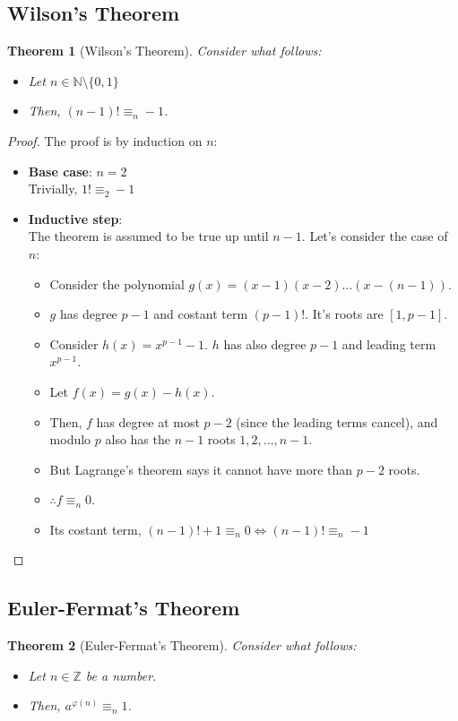 \documentclass[12pt, a4paper, english]{report}
\newtheorem{theorem}{Theorem}
\begin{document}
\subsection{Wilson's Theorem}\label{wilson_th}
\begin{theorem}[Wilson's Theorem]
    Consider what follows:
    \begin{itemize}
        \item Let $n \in \mathbb{N} \setminus \{0,1\}$
        \item Then, $(n-1)! \equiv_{n} -1$.
    \end{itemize}
\end{theorem}
\begin{proof}
    The proof is by induction on $n$:
    \begin{itemize}
        \item \textbf{Base case}: $n = 2$\\
        Trivially, $1! \equiv_{2} -1$
        \item \textbf{Inductive step}:\\
        The theorem is assumed to be true up until $n - 1$. Let's consider the case of $n$:\\
        \begin{itemize}
            \item Consider the polynomial $g(x) = (x-1)(x-2) \dots (x - (n-1))$.
            \item $g$ has degree $p-1$ and costant term $(p-1)!$. It's roots are $[1,p-1]$.
            \item Consider $h(x) = x^{p-1} - 1$. $h$ has also degree $p-1$ and leading term $x^{p-1}$.
            \item Let $f(x) = g(x) - h(x)$.
            \item Then, $f$ has degree at most $p - 2$ (since the leading terms cancel), and modulo $p$ also has the $n - 1$ roots $1, 2, ..., n - 1$.
            \item But Lagrange's theorem says it cannot have more than $p - 2$ roots.
            \item $\therefore f \equiv_{n} 0$.
            \item Its costant term, $(n-1)! + 1 \equiv_{n} 0 \iff (n-1)! \equiv_{n} -1$
        \end{itemize}
    \end{itemize}
\end{proof}

\subsection{Euler-Fermat's Theorem}\label{euler_fermat_th}
\begin{theorem}[Euler-Fermat's Theorem]
    Consider what follows:
    \begin{itemize}
        \item Let $n \in \mathbb{Z}$ be a number.
        \item Then, $a^{\varphi(n)} \equiv_{n} 1$.
    \end{itemize}
\end{theorem}
\end{document}
